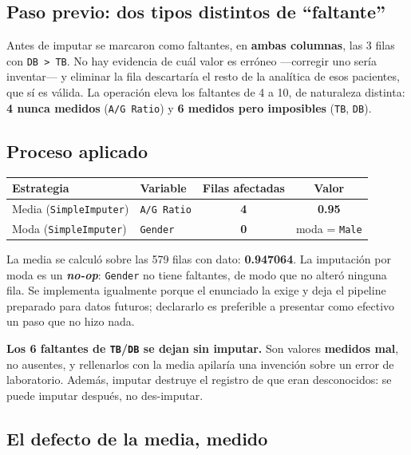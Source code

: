 \documentclass[10pt,a4paper]{article}
\begin{document}
\subsection{Paso previo: dos tipos distintos de ``faltante''}

Antes de imputar se marcaron como faltantes, en \textbf{ambas columnas}, las 3 filas con \texttt{DB > TB}. No hay evidencia de cuál valor es erróneo ---corregir uno sería inventar--- y eliminar la fila descartaría el resto de la analítica de esos pacientes, que sí es válida. La operación eleva los faltantes de 4 a 10, de naturaleza distinta: \textbf{4 nunca medidos} (\texttt{A/G Ratio}) y \textbf{6 medidos pero imposibles} (\texttt{TB}, \texttt{DB}).

\subsection{Proceso aplicado}

\begin{table}[H]
\footnotesize
\centering
\begin{tabular}{@{}llcc@{}}
\toprule
\textbf{Estrategia} & \textbf{Variable} & \textbf{Filas afectadas} & \textbf{Valor} \\
\midrule
Media (\texttt{SimpleImputer}) & \texttt{A/G Ratio} & \textbf{4} & \textbf{0.95} \\
Moda (\texttt{SimpleImputer}) & \texttt{Gender} & \textbf{0} & moda = \texttt{Male} \\
\bottomrule
\end{tabular}
\end{table}

La media se calculó sobre las 579 filas con dato: \textbf{0.947064}. La imputación por moda es un \textbf{\textit{no-op}}: \texttt{Gender} no tiene faltantes, de modo que no alteró ninguna fila. Se implementa igualmente porque el enunciado la exige y deja el pipeline preparado para datos futuros; declararlo es preferible a presentar como efectivo un paso que no hizo nada.

\textbf{Los 6 faltantes de \texttt{TB}/\texttt{DB} se dejan sin imputar.} Son valores \textbf{medidos mal}, no ausentes, y rellenarlos con la media apilaría una invención sobre un error de laboratorio. Además, imputar destruye el registro de que eran desconocidos: se puede imputar después, no des-imputar.

\subsection{El defecto de la media, medido}
\end{document}
